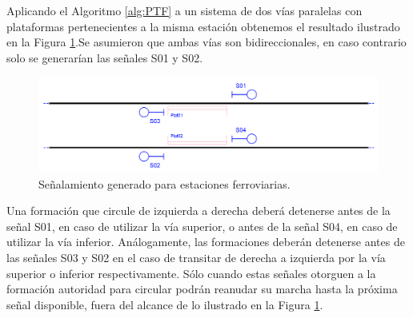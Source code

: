     Aplicando el Algoritmo \ref{alg:PTF} a un sistema de dos vías paralelas con plataformas pertenecientes a la misma estación obtenemos el resultado ilustrado en la Figura \ref{fig:signal_platform}.Se asumieron que ambas vías son bidireccionales, en caso contrario solo se generarían las señales S01 y S02.
    
    \begin{figure}[h!]
        \centering
        \includegraphics[width=1\textwidth]{Figuras/platforms.PNG}
        \centering\caption{Señalamiento generado para estaciones ferroviarias.}
        \label{fig:signal_platform}
    \end{figure}
    
    Una formación que circule de izquierda a derecha deberá detenerse antes de la señal S01, en caso de utilizar la vía superior, o antes de la señal S04, en caso de utilizar la vía inferior. Análogamente, las formaciones deberán detenerse antes de las señales S03 y S02 en el caso de transitar de derecha a izquierda por la vía superior o inferior respectivamente. Sólo cuando estas señales otorguen a la formación autoridad para circular podrán reanudar su marcha hasta la próxima señal disponible, fuera del alcance de lo ilustrado en la Figura \ref{fig:signal_platform}.